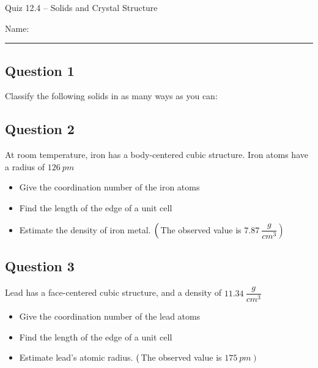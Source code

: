 \documentclass[11pt, letterpaper]{memoir}
\begin{document}
	\begin{center}
		{\large	Quiz 12.4 -- Solids and Crystal Structure}
	\end{center}
	{\large Name: \rule[-1mm]{4in}{.1pt} 
	
	\subsection*{Question 1}
	Classify the following solids in as many ways as you can:
	
	
	\vspace{3em}
	\subsection*{Question 2}
	At room temperature, iron has a body-centered cubic structure. Iron atoms have a radius of $126~pm$
	\begin{itemize}
		\item Give the coordination number of the iron atoms
		\item Find the length of the edge of a unit cell
		\item Estimate the density of iron metal. $\left(\vphantom{\dfrac{g}{cm^3}}\right.$The observed value is $\left.7.87~\dfrac{g}{cm^3}\right)$
	\end{itemize}
	
	\vspace{9em}
	\subsection*{Question 3}
	Lead has a face-centered cubic structure, and a density of $11.34~\dfrac{g}{cm^3}$
	\begin{itemize}
		\item Give the coordination number of the lead atoms
		\item Find the length of the edge of a unit cell
		\item Estimate lead's atomic radius. $\left(\vphantom{pm}\right.$The observed value is $\left.175~pm\right)$
	\end{itemize}

	\newpage
	\pagestyle{empty}
	\addtocounter{page}{-1}
}
\end{document}
